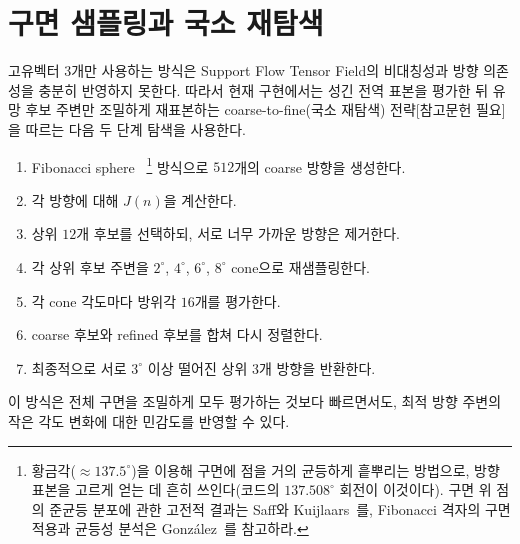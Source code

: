 \documentclass[11pt,a4paper]{article}
\begin{document}
\section{구면 샘플링과 국소 재탐색}

고유벡터 3개만 사용하는 방식은 Support Flow Tensor Field의 비대칭성과 방향 의존성을 충분히 반영하지 못한다.
따라서 현재 구현에서는 성긴 전역 표본을 평가한 뒤 유망 후보 주변만 조밀하게 재표본하는
coarse-to-fine(국소 재탐색) 전략[참고문헌 필요]을 따르는 다음 두 단계 탐색을 사용한다.

\begin{enumerate}
\item Fibonacci sphere~\cite{saff1997,gonzalez2010}%
\footnote{황금각($\approx137.5^\circ$)을 이용해 구면에 점을 거의 균등하게 흩뿌리는 방법으로,
방향 표본을 고르게 얻는 데 흔히 쓰인다(코드의 $137.508^\circ$ 회전이 이것이다).
구면 위 점의 준균등 분포에 관한 고전적 결과는 Saff와 Kuijlaars~\cite{saff1997}를,
Fibonacci 격자의 구면 적용과 균등성 분석은 González~\cite{gonzalez2010}를 참고하라.}
방식으로 $512$개의 coarse 방향을 생성한다.
\item 각 방향에 대해 $J(n)$을 계산한다.
\item 상위 $12$개 후보를 선택하되, 서로 너무 가까운 방향은 제거한다.
\item 각 상위 후보 주변을 $2^\circ$, $4^\circ$, $6^\circ$, $8^\circ$ cone으로 재샘플링한다.
\item 각 cone 각도마다 방위각 $16$개를 평가한다.
\item coarse 후보와 refined 후보를 합쳐 다시 정렬한다.
\item 최종적으로 서로 $3^\circ$ 이상 떨어진 상위 3개 방향을 반환한다.
\end{enumerate}

이 방식은 전체 구면을 조밀하게 모두 평가하는 것보다 빠르면서도,
최적 방향 주변의 작은 각도 변화에 대한 민감도를 반영할 수 있다.
\end{document}
